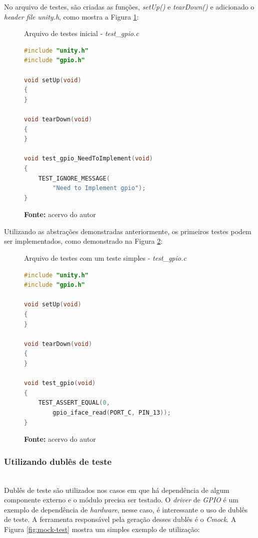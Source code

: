 \documentclass[times, twoside, watermark]{artigo}
\begin{document}
No arquivo de testes, são criadas as funções, \textit{setUp()} e
\textit{tearDown()} e adicionado o \textit{header file unity.h}, como 
mostra a Figura \ref{fig:tests-init}:\hfill\\

\begin{figure}[H]
  \centering
  \caption{Arquivo de testes inicial - \textit{test\_gpio.c}}
\begin{lstlisting}[language=C]
#include "unity.h"
#include "gpio.h"

void setUp(void)
{
}

void tearDown(void)
{
}

void test_gpio_NeedToImplement(void)
{
    TEST_IGNORE_MESSAGE(
        "Need to Implement gpio");
}
\end{lstlisting}
  \label{fig:tests-init}
  \caption*{\newline\textbf{Fonte:} acervo do autor}
\end{figure}

Utilizando as abstrações demonstradas anteriormente, os primeiros testes podem ser
implementados, como demonstrado na Figura \ref{fig:simple-test}:\hfill\\

\begin{figure}[H]
  \centering
  \caption{Arquivo de testes com um teste simples  - \textit{test\_gpio.c}}
\begin{lstlisting}[language=C]
#include "unity.h"
#include "gpio.h"

void setUp(void)
{
}

void tearDown(void)
{
}

void test_gpio(void)
{
    TEST_ASSERT_EQUAL(0, 
        gpio_iface_read(PORT_C, PIN_13));
}
\end{lstlisting}
  \label{fig:simple-test}
  \caption*{\newline\textbf{Fonte:} acervo do autor}
\end{figure}

\subsubsection{Utilizando dublês de teste}\hfill\\

Dublês de teste são utilizados nos casos em que há dependência de algum componente
externo e o módulo precisa ser testado. O \textit{driver} de \textit{GPIO} é um
exemplo de dependência de \textit{hardware}, nesse caso, é interessante o uso
de dublês de teste. A ferramenta responsável pela geração desses dublês é o
\textit{Cmock}. A Figura \ref{fig:mock-test} mostra um simples exemplo de utilização:
\hfill\\
\end{document}
